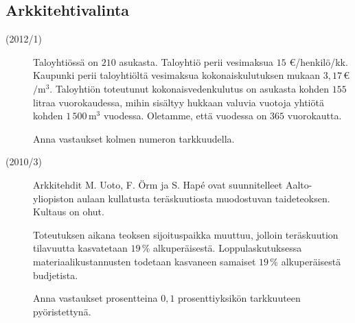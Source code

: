 \subsection*{Arkkitehtivalinta}


\begin{description}
    \item[(2012/1)] Taloyhtiössä on $210$ asukasta. Taloyhtiö perii vesimaksua $15$ \euro/henkilö/kk. Kaupunki perii taloyhtiöltä vesimaksua kokonaiskulutuksen mukaan $3,17$\,\euro $/ \mathrm{m}^3$. Taloyhtiön toteutunut kokonaisvedenkulutus on asukasta kohden $155$ litraa vuorokaudessa, mihin sisältyy hukkaan valuvia vuotoja yhtiötä kohden $1\,500\,\mathrm{m}^3$ vuodessa. Oletamme, että vuodessa on $365$ vuorokautta.
                    
    
    Anna vastaukset kolmen numeron tarkkuudella.
\end{description}


\begin{description}
    \item[(2010/3)] Arkkitehdit M. Uoto, F. Örm ja S. Hapé ovat suunnitelleet Aalto-yliopiston aulaan kullatusta teräskuutiosta muodostuvan taideteoksen. Kultaus on ohut.
    
    Toteutuksen aikana teoksen sijoituspaikka muuttuu, jolloin teräskuution tilavuutta kasvatetaan $19$\,\% alkuperäisestä. Loppulaskutuksessa materiaalikustannusten todetaan kasvaneen samaiset $19$\,\% alkuperäisestä budjetista.                   
    
    Anna vastaukset prosentteina $0,1$ prosenttiyksikön tarkkuuteen pyöristettynä.
\end{description}

